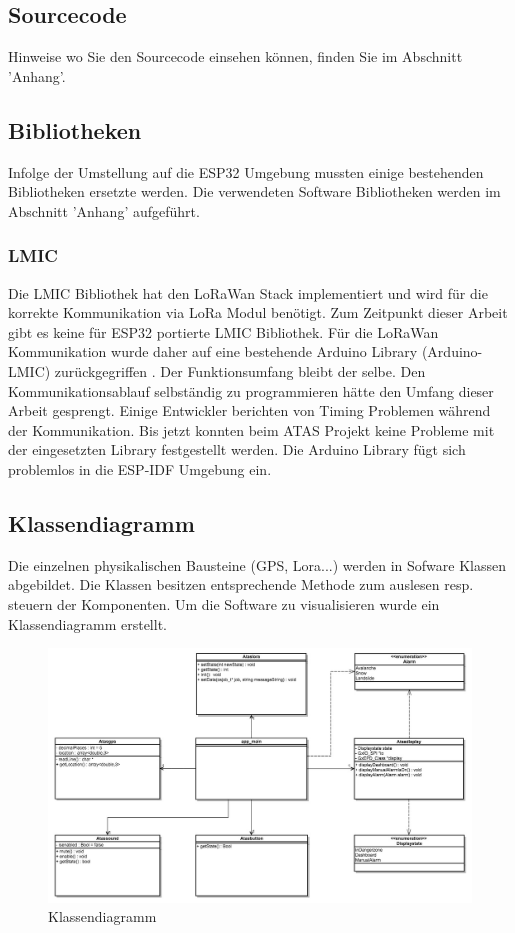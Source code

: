 \documentclass[11pt,english,german]{report}
\theoremstyle{definition}
\begin{document}
\subsection{Sourcecode}
Hinweise wo Sie den Sourcecode einsehen können, finden Sie im Abschnitt 'Anhang'.

\newpage

\subsection{Bibliotheken}
Infolge der Umstellung auf die ESP32 Umgebung mussten einige bestehenden Bibliotheken ersetzte werden. Die verwendeten Software Bibliotheken werden im Abschnitt 'Anhang' aufgeführt.

\subsubsection{LMIC}
Die LMIC Bibliothek hat den LoRaWan Stack implementiert und wird für die korrekte Kommunikation via LoRa Modul benötigt. Zum Zeitpunkt dieser Arbeit gibt es keine für ESP32 portierte LMIC Bibliothek. Für die LoRaWan Kommunikation wurde daher auf eine bestehende Arduino Library (Arduino-LMIC) zurückgegriffen \cite{ArduinoLMIC}. Der Funktionsumfang bleibt der selbe. Den Kommunikationsablauf selbständig zu programmieren hätte den Umfang dieser Arbeit gesprengt. Einige Entwickler berichten von Timing Problemen während der Kommunikation. Bis jetzt konnten beim ATAS Projekt keine Probleme mit der eingesetzten Library festgestellt werden. Die Arduino Library fügt sich problemlos in die ESP-IDF Umgebung ein.

\subsection{Klassendiagramm}
Die einzelnen physikalischen Bausteine (GPS, Lora...) werden in Sofware Klassen abgebildet. Die Klassen besitzen entsprechende Methode zum auslesen resp. steuern der Komponenten. Um die Software zu visualisieren wurde ein Klassendiagramm erstellt.
\begin{figure}[H]
	\centering
	\includegraphics[width=\textwidth]{img/classdiagram.jpg}
	\caption[Klassendiagramm]
	{Klassendiagramm}
\end{figure}
\end{document}
